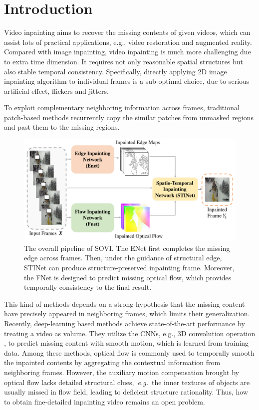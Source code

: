 \section{Introduction}
\noindent Video inpainting aims to recover the missing contents of given videos, which can assist lots of practical applications, e.g., video restoration and augmented reality. Compared with image inpainting, video inpainting is much more challenging due to extra time dimension. It requires not only reasonable spatial structures but also stable temporal consistency. Specifically, directly applying 2D image inpainting algorithm \cite{yu2018free,Xiong_2019_CVPR} to individual frames is a sub-optimal choice, due to serious artificial effect, flickers and jitters. 

To exploit complementary neighboring information across frames, traditional patch-based methods \cite{patwardhan2007video,wexler2004space,newson2014video} recurrently copy the similar patches from unmasked regions and past them to the missing regions. 
\begin{figure}[t]
	\centering
	\includegraphics[width=1.0\columnwidth]{zong} %
	\caption{The overall pipeline of SOVI. The ENet first completes the missing edge across frames. Then, under the guidance of structural edge, STINet can produce structure-preserved inpainting frame. Moreover, the FNet is designed to predict missing optical flow, which provides temporally consistency to the final result.}
	\label{zong}
\end{figure}
This kind of methods depends on a strong hypothesis that the missing content have precisely appeared in neighboring frames, which limits their generalization.
Recently, deep-learning based methods achieve state-of-the-art performance by treating a video as volume.
They utilize the CNNs, e.g., 3D convolution operation \cite{wang2019video}, to predict missing content with smooth motion, which is learned from training data.
Among these methods, optical flow is commonly used to temporally smooth the inpainted contents \cite{Xu_2019_CVPR,Kim_2019_CVPR,Kim_2019_CVPR1} by aggregating the contextual information from neighboring frames.
However, the auxiliary motion compensation brought by optical flow lacks detailed structural clues,~\emph{e.g.}~the inner textures of objects are usually missed in flow field, leading to deficient structure rationality.
Thus, how to obtain fine-detailed inpainting video remains an open problem.






